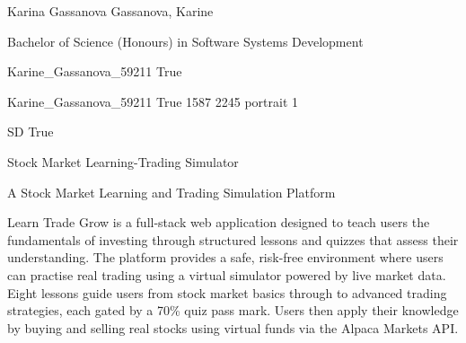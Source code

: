 
\begingroup{}\relax



\def\Key{Karine_Gassanova_59211}

{Karina Gassanova}
{Gassanova, Karine}

{Bachelor of Science (Honours) in Software Systems Development}

{Karine_Gassanova_59211}
{True}

{Karine_Gassanova_59211}
{True}
{1587}
{2245}
{portrait}
{1}

{SD}
{True}

{Stock Market Learning-Trading Simulator}

{A Stock Market Learning and Trading Simulation Platform}

{Learn Trade Grow is a full-stack web application designed to teach users the fundamentals of investing through structured lessons and quizzes that assess their understanding. The platform provides a safe, risk-free environment where users can practise real trading using a virtual simulator powered by live market data.  Eight lessons guide users from stock market basics through to advanced trading strategies, each gated by a 70\% quiz pass mark. Users then apply their knowledge by buying and selling real stocks using virtual funds via the Alpaca Markets API.}


